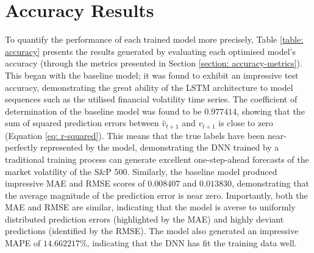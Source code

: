 \documentclass[a4paper, 11pt]{report}
\begin{document}
    \section{Accuracy Results}

    To quantify the performance of each trained model more precisely, Table \ref{table: accuracy} presents the results generated by evaluating each optimised model's accuracy (through the metrics presented in Section \ref{section: accuracy-metrics}). This began with the baseline model; it was found to exhibit an impressive test accuracy, demonstrating the great ability of the LSTM architecture to model sequences such as the utilised financial volatility time series. The coefficient of determination of the baseline model was found to be $0.977414$, showing that the sum of squared prediction errors between $\hat{v}_{t+1}$ and $v_{t+1}$ is close to zero (Equation \ref{eq: r-squared}). This means that the true labels have been near-perfectly represented by the model, demonstrating the DNN trained by a traditional training process can generate excellent one-step-ahead forecasts of the market volatility of the S\&P 500. Similarly, the baseline model produced impressive MAE and RMSE scores of $0.008407$ and $0.013830$, demonstrating that the average magnitude of the prediction error is near zero. Importantly, both the MAE and RMSE are similar, indicating that the model is averse to uniformly distributed prediction errors (highlighted by the MAE) and highly deviant predictions (identified by the RMSE). The model also generated an impressive MAPE of $14.662217\%$, indicating that the DNN has fit the training data well.
\end{document}
